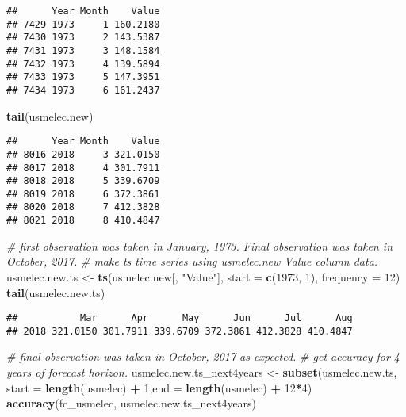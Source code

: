 \documentclass[]{article}
\newenvironment{Shaded}{\begin{snugshade}}{\end{snugshade}}
\newcommand{\KeywordTok}[1]{\textcolor[rgb]{0.13,0.29,0.53}{\textbf{#1}}}
\newcommand{\DataTypeTok}[1]{\textcolor[rgb]{0.13,0.29,0.53}{#1}}
\newcommand{\DecValTok}[1]{\textcolor[rgb]{0.00,0.00,0.81}{#1}}
\newcommand{\StringTok}[1]{\textcolor[rgb]{0.31,0.60,0.02}{#1}}
\newcommand{\CommentTok}[1]{\textcolor[rgb]{0.56,0.35,0.01}{\textit{#1}}}
\newcommand{\OperatorTok}[1]{\textcolor[rgb]{0.81,0.36,0.00}{\textbf{#1}}}
\newcommand{\NormalTok}[1]{#1}
\begin{document}
\begin{verbatim}
##      Year Month    Value
## 7429 1973     1 160.2180
## 7430 1973     2 143.5387
## 7431 1973     3 148.1584
## 7432 1973     4 139.5894
## 7433 1973     5 147.3951
## 7434 1973     6 161.2437
\end{verbatim}

\begin{Shaded}
\begin{Highlighting}[]
\KeywordTok{tail}\NormalTok{(usmelec.new)}
\end{Highlighting}
\end{Shaded}

\begin{verbatim}
##      Year Month    Value
## 8016 2018     3 321.0150
## 8017 2018     4 301.7911
## 8018 2018     5 339.6709
## 8019 2018     6 372.3861
## 8020 2018     7 412.3828
## 8021 2018     8 410.4847
\end{verbatim}

\begin{Shaded}
\begin{Highlighting}[]
\CommentTok{# first observation was taken in January, 1973. Final observation was taken in October, 2017.}
\CommentTok{# make ts time series using usmelec.new Value column data.}
\NormalTok{usmelec.new.ts <-}\StringTok{ }\KeywordTok{ts}\NormalTok{(usmelec.new[, }\StringTok{"Value"}\NormalTok{], }\DataTypeTok{start =} \KeywordTok{c}\NormalTok{(}\DecValTok{1973}\NormalTok{, }\DecValTok{1}\NormalTok{), }\DataTypeTok{frequency =} \DecValTok{12}\NormalTok{)}
\KeywordTok{tail}\NormalTok{(usmelec.new.ts)}
\end{Highlighting}
\end{Shaded}

\begin{verbatim}
##           Mar      Apr      May      Jun      Jul      Aug
## 2018 321.0150 301.7911 339.6709 372.3861 412.3828 410.4847
\end{verbatim}

\begin{Shaded}
\begin{Highlighting}[]
\CommentTok{# final observation was taken in October, 2017 as expected. }
\CommentTok{# get accuracy for 4 years of forecast horizon.}
\NormalTok{usmelec.new.ts_next4years <-}\StringTok{ }\KeywordTok{subset}\NormalTok{(usmelec.new.ts, }\DataTypeTok{start =} \KeywordTok{length}\NormalTok{(usmelec) }\OperatorTok{+}\StringTok{ }\DecValTok{1}\NormalTok{,}\DataTypeTok{end =} \KeywordTok{length}\NormalTok{(usmelec) }\OperatorTok{+}\StringTok{ }\DecValTok{12}\OperatorTok{*}\DecValTok{4}\NormalTok{)}
\KeywordTok{accuracy}\NormalTok{(fc_usmelec, usmelec.new.ts_next4years)}
\end{Highlighting}
\end{Shaded}
\end{document}
